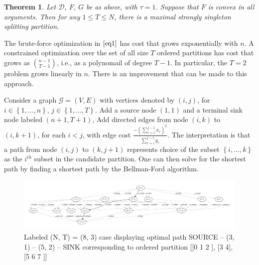 \documentclass{article}
\newtheorem{thm}{Theorem}
\theoremstyle{case}
\begin{document}
\begin{thm} \label{thm3}
Let $\mathcal{D}$, $F$, $G$ be as above, with $\tau = 1$. Suppose that $F$ is convex in all arguments. Then for any $1 \leq T \leq N$, there is a maximal strongly singleton splitting partition.
\end{thm}


The brute-force optimization in $\ref{eq1}$ has cost that grows exponentially with $n$. A constrained optimization over the set of all size $T$ ordered partitions has cost that grows as $\binom{n-1}{T-1}$, i.e., as a polynomail of degree $T-1$. In particular, the $T = 2$ problem grows linearly in $n$. There is an improvement that can be made to this approach.

Consider a graph $\mathcal{G} = \left( V, E\right)$ with vertices denoted by $\left( i, j\right)$, for $i \in \left\lbrace 1, \dots, n\right\rbrace$, $j \in \left\lbrace 1, \dots, T\right\rbrace$. Add a source node $\left( 1, 1\right)$ and a terminal sink node labeled $\left( n+1, T+1\right)$, Add directed edges from node $\left( i,k \right)$ to $\left( i, k+1\right)$, for each $i < j$, with edge cost $\frac{-\left(\sum_{r=i}^{j-1} x_r\right)^2}{\sum_{r=i}^{j-1} y_r}$. The interpretation is that a path from node $\left( i, j\right)$ to $\left( k, j+1\right)$ represents choice of the subset $\left\lbrace i, \dots, k\right\rbrace$ as the $i^{th}$ subset in the candidate partition. One can then solve for the shortest path by finding a shortest path by the Bellman-Ford algorithm. 


% 

\vspace{16pt}
\begin{figure}
  \includegraphics[scale=.25]{8_3_labeled.pdf}
  \caption{Labeled (N, T) = (8, 3) case displaying optimal path SOURCE -- (3, 1) -- (5, 2) --  SINK corresponding to ordered partition [[0 1 2 ], [3 4], [5 6 7 ]]}
\end{figure}
\end{document}
